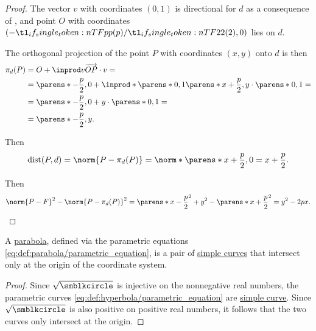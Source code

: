 \begin{proof}
   The vector \( v \) with coordinates \( (0, 1) \) is directional for \( d \) as a consequence of , and point \( O \) with coordinates \( (-\ifrac p 2, 0) \) lies on \( d \).

  The orthogonal projection of the point \( P \) with coordinates \( (x, y) \) onto \( d \) is then
  \begin{align*}
    \pi_d(P)
    &=
    O + \inprod v {\vect{OP}} \cdot v
    = \\ &=
    \parens*{ -\frac p 2, 0 } + \inprod*{ \parens*{ 0, 1 } } { \parens*{ x + \frac p 2, y } } \cdot \parens*{ 0, 1 }
    = \\ &=
    \parens*{ -\frac p 2, 0 } + y \cdot \parens*{ 0, 1 }
    = \\ &=
    \parens*{ -\frac p 2, y }.
  \end{align*}

  Then
  \begin{equation*}
    \op{dist}(P, d)
    =
    \norm{P - \pi_d(P)}
    =
    \norm*{\parens*{ x + \frac p 2, 0 }}
    =
    x + \frac p 2.
  \end{equation*}

  Then
  \begin{equation*}
    \norm{P - F}^2 - \norm{P - \pi_d(P)}^2
    =
    \parens*{ x - \frac p 2 }^2 + y^2 - \parens*{ x + \frac p 2 }^2
    =
    y^2 - 2px.
  \end{equation*}
\end{proof}

\begin{proposition}\label{thm:parabola_is_closed_simple_curve}
  A \hyperref[def:parabola]{parabola}, defined via the parametric equations \eqref{eq:def:parabola/parametric_equation}, is a pair of \hyperref[def:parametric_curve/simple]{simple curves} that intersect only at the origin of the coordinate system.
\end{proposition}
\begin{proof}
  Since \( \sqrt {\anon} \) is injective on the nonnegative real numbers, the parametric curves \eqref{eq:def:hyperbola/parametric_equation} are \hyperref[def:parametric_curve/simple]{simple curve}. Since \( \sqrt {\anon} \) is also positive on positive real numbers, it follows that the two curves only intersect at the origin.
\end{proof}

